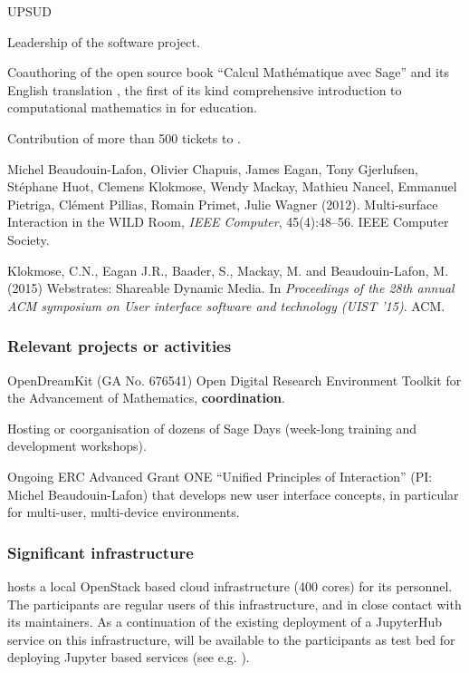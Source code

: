 \begin{sitedescription}{UPSUD}
\begin{compactenum}
\item Leadership of the \SageCombinat software project.
\item Coauthoring of the open source book ``Calcul Mathématique avec
  Sage'' and its English translation , the first of its kind
  comprehensive introduction to computational mathematics in \Sage for
  education.
\item Contribution of more than 500 tickets to \Sage.
\item
Michel Beaudouin-Lafon, Olivier Chapuis, James Eagan, Tony Gjerlufsen, Stéphane Huot, Clemens Klokmose, Wendy Mackay, Mathieu Nancel, Emmanuel Pietriga, Clément Pillias, Romain Primet, Julie Wagner (2012). Multi-surface Interaction in the WILD Room, \emph{IEEE Computer}, 45(4):48–56. IEEE Computer Society.
\item
Klokmose, C.N., Eagan J.R., Baader, S., Mackay, M. and Beaudouin-Lafon, M. (2015) Webstrates: Shareable Dynamic Media. In \emph{Proceedings of the 28th annual ACM symposium on User interface software and technology (UIST ’15)}. ACM.
\end{compactenum}

\subsubsection*{Relevant projects or activities}

\begin{compactenum}
\item OpenDreamKit (GA No. 676541) Open Digital Research Environment
  Toolkit for the Advancement of Mathematics, \textbf{coordination}.
\item Hosting or coorganisation of dozens of Sage Days (week-long training and development workshops).
\item {}
Ongoing ERC Advanced Grant ONE ``Unified Principles of Interaction'' (PI: Michel Beaudouin-Lafon) that develops new user interface concepts, in particular for multi-user, multi-device environments.
\end{compactenum}

\subsubsection*{Significant infrastructure}

 hosts a local OpenStack based cloud infrastructure
 (400 cores) for its personnel. The participants
are regular users of this infrastructure, and in close contact with
its maintainers. As a continuation of the existing deployment of a
JupyterHub service on this infrastructure,  will be
available to the participants as test bed for deploying Jupyter based
services (see e.g. ).


\end{sitedescription}
